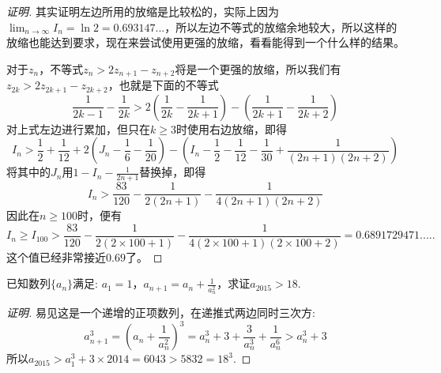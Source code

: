 \begin{proof}[证明]
其实证明左边所用的放缩是比较松的，实际上因为$\lim_{n\to\infty}I_n=\ln{2}=0.693147...$，所以左边不等式的放缩余地较大，所以这样的放缩也能达到要求，现在来尝试使用更强的放缩，看看能得到一个什么样的结果。

对于$z_{n}$，不等式$z_n>2z_{n+1}-z_{n+2}$将是一个更强的放缩，所以我们有$z_{2k}>2z_{2k+1}-z_{2k+2}$，也就是下面的不等式
\begin{equation*}
  \frac{1}{2k-1}-\frac{1}{2k} > 2 \left( \frac{1}{2k}-\frac{1}{2k+1} \right) - \left( \frac{1}{2k+1}-\frac{1}{2k+2} \right)
\end{equation*}
对上式左边进行累加，但只在$k\geqslant 3$时使用右边放缩，即得
\begin{equation*}
  I_n > \frac{1}{2}+\frac{1}{12} + 2 \left( J_n-\frac{1}{6}-\frac{1}{20} \right) - \left( I_n-\frac{1}{2}-\frac{1}{12}-\frac{1}{30}+\frac{1}{(2n+1)(2n+2)} \right)
\end{equation*}
将其中的$J_{n}$用$1-I_n-\frac{1}{2n+1}$替换掉，即得
\begin{equation*}
  I_n>\frac{83}{120}-\frac{1}{2(2n+1)}-\frac{1}{4(2n+1)(2n+2)}
\end{equation*}
因此在$n \geqslant 100$时，便有
\begin{equation*}
  I_n \geqslant I_{100} > \frac{83}{120}-\frac{1}{2(2\times 100+1)}-\frac{1}{4(2\times 100+1)(2 \times 100 + 2)} = 0.6891729471.....
\end{equation*}
这个值已经非常接近$0.69$了。
\end{proof}

\begin{exercise}
  已知数列$\{a_n\}$满足: $a_1=1$，$a_{n+1}=a_n+\frac{1}{a_n^2}$，求证$a_{2015}>18$.
\end{exercise}

\begin{proof}[证明]
  易见这是一个递增的正项数列，在递推式两边同时三次方:
  \begin{equation*}
    a_{n+1}^3=\left( a_n+\frac{1}{a_n^2} \right)^3 = a_n^3+3+\frac{3}{a_n^3}+\frac{1}{a_n^6}>a_n^3+3
  \end{equation*}
  所以$a_{2015}>a_1^3+3\times 2014=6043 > 5832 = 18^3$.
\end{proof}


